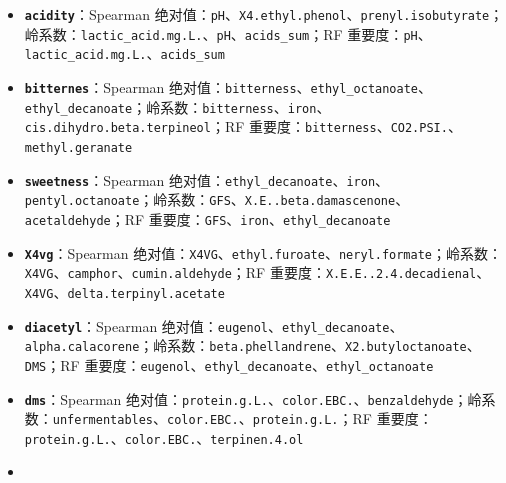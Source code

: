 \documentclass[
  11pt,
]{ctexart}
\newcounter{none} %
\begin{document}
\begin{itemize}
  重要度：\texttt{X.\allowbreak{}E.\allowbreak{}.\allowbreak{}alpha.\allowbreak{}ionone}、\texttt{MeSH}、\texttt{betaglucan.\allowbreak{}mg.\allowbreak{}L.\allowbreak{}}
\item
  \textbf{\texttt{acidity}}：Spearman
  绝对值：\texttt{pH}、\texttt{X4.\allowbreak{}ethyl.\allowbreak{}phenol}、\texttt{prenyl.\allowbreak{}isobutyrate}；岭系数：\texttt{lactic\_\allowbreak{}acid.\allowbreak{}mg.\allowbreak{}L.\allowbreak{}}、\texttt{pH}、\texttt{acids\_sum}；RF
  重要度：\texttt{pH}、\texttt{lactic\_\allowbreak{}acid.\allowbreak{}mg.\allowbreak{}L.\allowbreak{}}、\texttt{acids\_sum}
\item
  \textbf{\texttt{bitternes}}：Spearman
  绝对值：\texttt{bitterness}、\texttt{ethyl\_\allowbreak{}octanoate}、\texttt{ethyl\_\allowbreak{}decanoate}；岭系数：\texttt{bitterness}、\texttt{iron}、\texttt{cis.\allowbreak{}dihydro.\allowbreak{}beta.\allowbreak{}terpineol}；RF
  重要度：\texttt{bitterness}、\texttt{CO2.PSI.}、\texttt{methyl.\allowbreak{}geranate}
\item
  \textbf{\texttt{sweetness}}：Spearman
  绝对值：\texttt{ethyl\_\allowbreak{}decanoate}、\texttt{iron}、\texttt{pentyl.\allowbreak{}octanoate}；岭系数：\texttt{GFS}、\texttt{X.\allowbreak{}E.\allowbreak{}.\allowbreak{}beta.\allowbreak{}damascenone}、\texttt{acetaldehyde}；RF
  重要度：\texttt{GFS}、\texttt{iron}、\texttt{ethyl\_\allowbreak{}decanoate}
\item
  \textbf{\texttt{X4vg}}：Spearman
  绝对值：\texttt{X4VG}、\texttt{ethyl.furoate}、\texttt{neryl.formate}；岭系数：\texttt{X4VG}、\texttt{camphor}、\texttt{cumin.\allowbreak{}aldehyde}；RF
  重要度：\texttt{X.\allowbreak{}E.\allowbreak{}E.\allowbreak{}.\allowbreak{}2.\allowbreak{}4.\allowbreak{}decadienal}、\texttt{X4VG}、\texttt{delta.\allowbreak{}terpinyl.\allowbreak{}acetate}
\item
  \textbf{\texttt{diacetyl}}：Spearman
  绝对值：\texttt{eugenol}、\texttt{ethyl\_\allowbreak{}decanoate}、\texttt{alpha.\allowbreak{}calacorene}；岭系数：\texttt{beta.\allowbreak{}phellandrene}、\texttt{X2.\allowbreak{}butyloctanoate}、\texttt{DMS}；RF
  重要度：\texttt{eugenol}、\texttt{ethyl\_\allowbreak{}decanoate}、\texttt{ethyl\_\allowbreak{}octanoate}
\item
  \textbf{\texttt{dms}}：Spearman
  绝对值：\texttt{protein.g.L.}、\texttt{color.EBC.}、\texttt{benzaldehyde}；岭系数：\texttt{unfermentables}、\texttt{color.EBC.}、\texttt{protein.g.L.}；RF
  重要度：\texttt{protein.g.L.}、\texttt{color.EBC.}、\texttt{terpinen.4.ol}
\item

\end{itemize}
\end{document}
